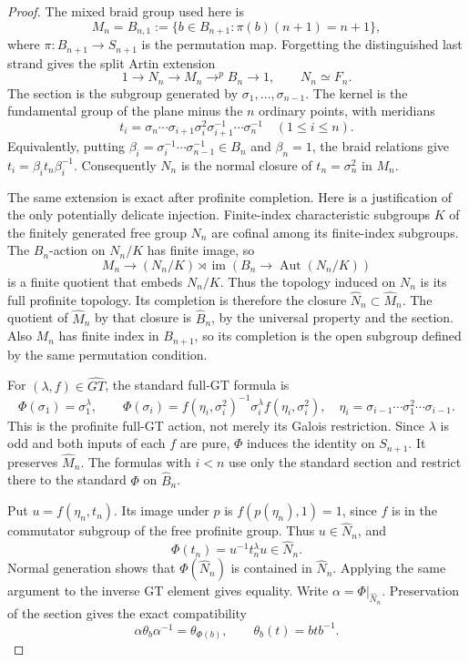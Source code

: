 \begin{proof}
The mixed braid group used here is
\[
 M_n=B_{n,1}:=\{b\in B_{n+1}:\pi(b)(n+1)=n+1\},
\]
where $\pi:B_{n+1}\to S_{n+1}$ is the permutation map.
Forgetting the distinguished last strand gives the split Artin
extension
\[
 1\longrightarrow N_n\longrightarrow M_n
 \mathop{\longrightarrow}^{p}B_n\longrightarrow1,
 \qquad N_n\simeq F_n.
\]
The section is the subgroup generated by
$\sigma_1,\ldots,\sigma_{n-1}$. The kernel is the fundamental
group of the plane minus the $n$ ordinary points, with meridians
\[
 t_i=\sigma_n\cdots\sigma_{i+1}\sigma_i^2
       \sigma_{i+1}^{-1}\cdots\sigma_n^{-1}
       \quad(1\leq i\leq n).
\]
Equivalently, putting
$\beta_i=\sigma_i^{-1}\cdots\sigma_{n-1}^{-1}\in B_n$
and $\beta_n=1$, the braid relations give
$t_i=\beta_i t_n\beta_i^{-1}$. Consequently $N_n$ is the
normal closure of $t_n=\sigma_n^2$ in $M_n$.

The same extension is exact after profinite completion. Here
is a justification of the only potentially delicate injection.
Finite-index characteristic subgroups $K$ of the finitely
generated free group $N_n$ are cofinal among its finite-index
subgroups. The $B_n$-action on $N_n/K$ has finite image, so
\[
 M_n\longrightarrow (N_n/K)\rtimes
             \operatorname{im}(B_n\to\operatorname{Aut}(N_n/K))
\]
is a finite quotient that embeds $N_n/K$. Thus the topology
induced on $N_n$ is its full profinite topology. Its completion
is therefore the closure $\widehat N_n\subset\widehat M_n$.
The quotient of $\widehat M_n$ by that closure is
$\widehat B_n$, by the universal property and the section.
Also $M_n$ has finite index in $B_{n+1}$, so its completion is
the open subgroup defined by the same permutation condition.

For $(\lambda,f)\in\widehat{GT}$, the standard full-GT formula is
\[
 \Phi(\sigma_1)=\sigma_1^\lambda,\qquad
 \Phi(\sigma_i)=f(\eta_i,\sigma_i^2)^{-1}
                   \sigma_i^\lambda f(\eta_i,\sigma_i^2),
 \quad
 \eta_i=\sigma_{i-1}\cdots\sigma_1^2\cdots\sigma_{i-1}.
\]
This is the profinite full-GT action, not merely its Galois
restriction. Since $\lambda$ is odd and both inputs of each
$f$ are pure, $\Phi$ induces the identity on $S_{n+1}$.
It preserves $\widehat M_n$. The formulas with $i<n$ use only
the standard section and restrict there to the standard
$\Phi$ on $\widehat B_n$.

Put $u=f(\eta_n,t_n)$. Its image under $p$ is
$f(p(\eta_n),1)=1$, since $f$ is in the commutator subgroup
of the free profinite group. Thus $u\in\widehat N_n$, and
\[
 \Phi(t_n)=u^{-1}t_n^\lambda u\in\widehat N_n.
\]
Normal generation shows that $\Phi(\widehat N_n)$ is contained
in $\widehat N_n$. Applying the same argument to the inverse
GT element gives equality. Write
$\alpha=\Phi|_{\widehat N_n}$. Preservation of the section
gives the exact compatibility
\[
 \alpha\theta_b\alpha^{-1}=\theta_{\Phi(b)},
 \qquad \theta_b(t)=btb^{-1}.
\]


\end{proof}
